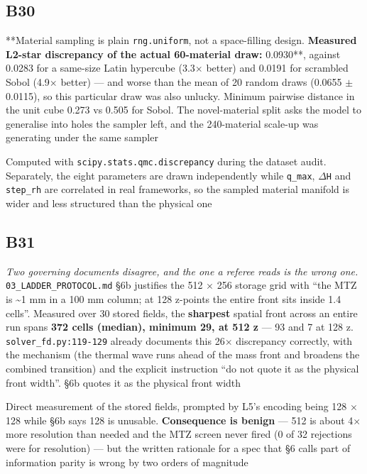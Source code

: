 \documentclass[10pt]{article}
\begin{document}
\subsection*{B30}\label{led:B30}
\begin{description}[leftmargin=0pt,itemsep=1pt]
\item[Defect.] **Material sampling is plain \texttt{rng.uniform}, not a space-filling design.\textbf{ Measured L2-star discrepancy of the actual 60-material draw: }0.0930**, against 0.0283 for a same-size Latin hypercube (3.3$\times$ better) and 0.0191 for scrambled Sobol (4.9$\times$ better) --- and worse than the mean of 20 random draws (0.0655 $\pm$ 0.0115), so this particular draw was also unlucky. Minimum pairwise distance in the unit cube 0.273 vs 0.505 for Sobol. The novel-material split asks the model to generalise into holes the sampler left, and the 240-material scale-up was generating under the same sampler
\item[How it was caught.] Computed with \texttt{scipy.stats.qmc.discrepancy} during the dataset audit. Separately, the eight parameters are drawn independently while \texttt{q\_max}, \texttt{$\Delta$H} and \texttt{step\_rh} are correlated in real frameworks, so the sampled material manifold is wider and less structured than the physical one
\end{description}
\subsection*{B31}\label{led:B31}
\begin{description}[leftmargin=0pt,itemsep=1pt]
\item[Defect.] \emph{Two governing documents disagree, and the one a referee reads is the wrong one.} \texttt{03\_LADDER\_PROTOCOL.md} §6b justifies the 512 $\times$ 256 storage grid with ``the MTZ is \textasciitilde{}1 mm in a 100 mm column; at 128 z-points the entire front sits inside 1.4 cells''. Measured over 30 stored fields, the \textbf{sharpest} spatial front across an entire run spans \textbf{372 cells (median), minimum 29, at 512 z} --- 93 and 7 at 128 z. \texttt{solver\_fd.py:119-129} already documents this 26$\times$ discrepancy correctly, with the mechanism (the thermal wave runs ahead of the mass front and broadens the combined transition) and the explicit instruction ``do not quote it as the physical front width''. §6b quotes it as the physical front width
\item[How it was caught.] Direct measurement of the stored fields, prompted by L5's encoding being 128 $\times$ 128 while §6b says 128 is unusable. \textbf{Consequence is benign} --- 512 is about 4$\times$ more resolution than needed and the MTZ screen never fired (0 of 32 rejections were for resolution) --- but the written rationale for a spec that §6 calls part of information parity is wrong by two orders of magnitude
\end{description}
\end{document}
